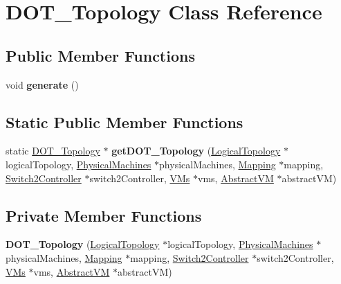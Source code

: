 \hypertarget{classDOT__Topology}{\section{\-D\-O\-T\-\_\-\-Topology \-Class \-Reference}
\label{classDOT__Topology}
}
\subsection*{\-Public \-Member \-Functions}
\begin{DoxyCompactItemize}
\item 
\hypertarget{classDOT__Topology_a417ebe853e880733d960f76b67cf0218}{void {\bfseries generate} ()}\label{classDOT__Topology_a417ebe853e880733d960f76b67cf0218}

\end{DoxyCompactItemize}
\subsection*{\-Static \-Public \-Member \-Functions}
\begin{DoxyCompactItemize}
\item 
\hypertarget{classDOT__Topology_ab0a1844cf8ff4fe4b32994b623814a1e}{static \hyperlink{classDOT__Topology}{\-D\-O\-T\-\_\-\-Topology} $\ast$ {\bfseries get\-D\-O\-T\-\_\-\-Topology} (\hyperlink{classLogicalTopology}{\-Logical\-Topology} $\ast$logical\-Topology, \hyperlink{classPhysicalMachines}{\-Physical\-Machines} $\ast$physical\-Machines, \hyperlink{classMapping}{\-Mapping} $\ast$mapping, \hyperlink{classSwitch2Controller}{\-Switch2\-Controller} $\ast$switch2\-Controller, \hyperlink{classVMs}{\-V\-Ms} $\ast$vms, \hyperlink{classAbstractVM}{\-Abstract\-V\-M} $\ast$abstract\-V\-M)}\label{classDOT__Topology_ab0a1844cf8ff4fe4b32994b623814a1e}

\end{DoxyCompactItemize}
\subsection*{\-Private \-Member \-Functions}
\begin{DoxyCompactItemize}
\item 
\hypertarget{classDOT__Topology_a53bd85856afb96c3f8542b5bc28b6309}{{\bfseries \-D\-O\-T\-\_\-\-Topology} (\hyperlink{classLogicalTopology}{\-Logical\-Topology} $\ast$logical\-Topology, \hyperlink{classPhysicalMachines}{\-Physical\-Machines} $\ast$physical\-Machines, \hyperlink{classMapping}{\-Mapping} $\ast$mapping, \hyperlink{classSwitch2Controller}{\-Switch2\-Controller} $\ast$switch2\-Controller, \hyperlink{classVMs}{\-V\-Ms} $\ast$vms, \hyperlink{classAbstractVM}{\-Abstract\-V\-M} $\ast$abstract\-V\-M)}\label{classDOT__Topology_a53bd85856afb96c3f8542b5bc28b6309}

\end{DoxyCompactItemize}
